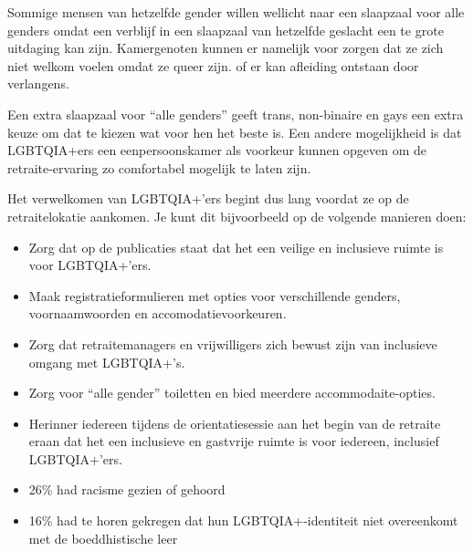 \documentclass[12pt,openany]{book}
\begin{document}
Sommige mensen van hetzelfde gender willen wellicht naar een slaapzaal voor alle genders omdat een verblijf in een slaapzaal van hetzelfde geslacht een te grote uitdaging kan zijn. Kamergenoten kunnen er namelijk voor zorgen dat ze zich niet welkom voelen omdat ze queer zijn. of er kan afleiding ontstaan door verlangens.

Een extra slaapzaal voor “alle genders” geeft trans, non-binaire en gays een extra keuze om dat te kiezen wat voor hen het beste is. Een andere mogelijkheid is dat LGBTQIA+ers een eenpersoonskamer als voorkeur kunnen opgeven om de retraite-ervaring zo comfortabel mogelijk te laten zijn. 

Het verwelkomen van LGBTQIA+’ers begint dus lang voordat ze op de retraitelokatie aankomen. Je kunt dit bijvoorbeeld op de volgende manieren doen:

\begin{itemize}
  \item Zorg dat op de publicaties staat dat het een veilige en inclusieve ruimte is voor LGBTQIA+’ers.
  \item Maak registratieformulieren met opties voor verschillende genders, voornaamwoorden en accomodatievoorkeuren.
  \item Zorg dat retraitemanagers en vrijwilligers zich bewust zijn van inclusieve omgang met LGBTQIA+’s.
  \item Zorg voor “alle gender” toiletten en bied meerdere accommodaite-opties.
  \item Herinner iedereen tijdens de orientatiesessie aan het begin van de retraite eraan dat het een inclusieve en gastvrije ruimte is voor iedereen, inclusief LGBTQIA+’ers.
  \item 26\% had racisme gezien of gehoord
  \item 16\% had te horen gekregen dat hun LGBTQIA+-identiteit niet overeenkomt met de boeddhistische leer
\end{itemize}

\begin{figure}[h]
    \centering
\end{figure}
\end{document}
